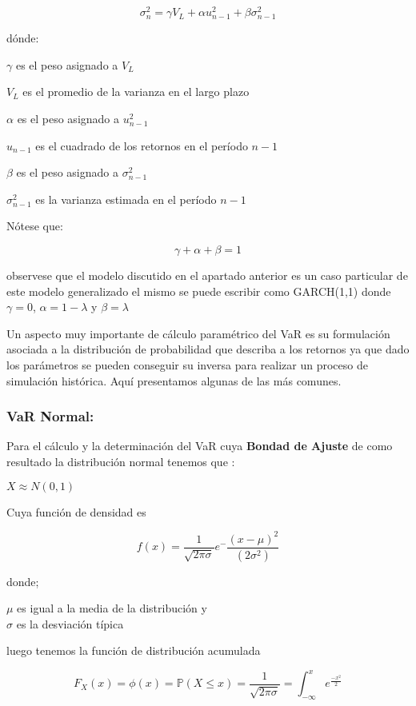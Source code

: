 \documentclass[]{article}
\begin{document}
\[\sigma_n^2 = \gamma V_L + \alpha u_{n-1}^2 + \beta \sigma_{n-1}^2\]

dónde:

\(\gamma\) es el peso asignado a \(V_L\)

\(V_L\) es el promedio de la varianza en el largo plazo

\(\alpha\) es el peso asignado a \(u_{n-1}^2\)

\(u_{n-1}\) es el cuadrado de los retornos en el período \(n-1\)

\(\beta\) es el peso asignado a \(\sigma_{n-1}^2\)

\(\sigma_{n-1}^2\) es la varianza estimada en el período \(n-1\)

Nótese que:

\[\gamma + \alpha + \beta = 1\]

observese que el modelo discutido en el apartado anterior es un caso
particular de este modelo generalizado el mismo se puede escribir como
GARCH(1,1) donde \(\gamma=0\), \(\alpha= 1 - \lambda\) y
\(\beta = \lambda\)

Un aspecto muy importante de cálculo paramétrico del VaR es su
formulación asociada a la distribución de probabilidad que describa a
los retornos ya que dado los parámetros se pueden conseguir su inversa
para realizar un proceso de simulación histórica. Aquí presentamos
algunas de las más comunes.

\hypertarget{var-normal}{%
\subsubsection{\texorpdfstring{\textbf{VaR
Normal:}}{VaR Normal:}}\label{var-normal}}

Para el cálculo y la determinación del VaR cuya \textbf{Bondad de
Ajuste} de como resultado la distribución normal tenemos que :

\(X \approx N(0,1)\)

Cuya función de densidad es

\[f(x) = \frac{1}{\sqrt{2 \pi \sigma}} e^-\frac{(x - \mu)^2}{(2 \sigma^2)}\]

donde;

\(\mu\) es igual a la media de la distribución y\\
\(\sigma\) es la desviación típica

luego tenemos la función de distribución acumulada

\[F_{X}(x) = \phi(x) = \mathbb{P}(X \leq x) = \frac{1}{\sqrt{2 \pi \sigma}} = \int_{-\infty}^{x}e^{\frac{-x^2}{2}}\]
\end{document}
